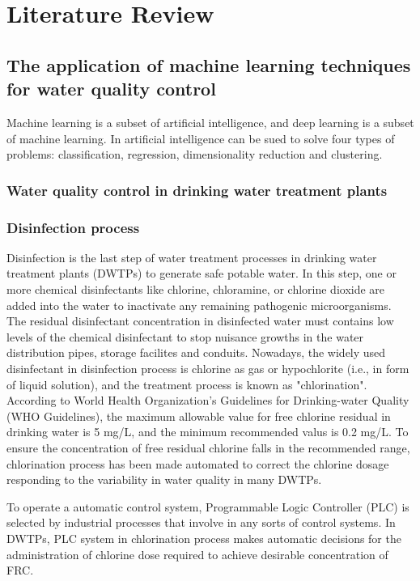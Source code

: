 \chapter{Literature Review}

\section{The application of machine learning techniques for water quality control}
Machine learning is a subset of artificial intelligence, and deep learning is a subset 
of machine learning. In artificial intelligence can be sued to solve four types of problems: 
classification, regression, dimensionality reduction and clustering. 
\subsection{Water quality control in drinking water treatment plants}
\subsection{Disinfection process}
Disinfection is the last step of water treatment processes in drinking water treatment plants (DWTPs) to generate safe potable water. In this step, one or more chemical disinfectants like chlorine, chloramine, or chlorine dioxide are added into the water to inactivate any remaining pathogenic microorganisms. The residual disinfectant concentration in disinfected water must contains low levels of the chemical disinfectant to stop nuisance growths in the water distribution pipes, storage facilites and conduits. Nowadays, the widely used disinfectant in disinfection process is chlorine as gas or hypochlorite (i.e., in form of liquid solution), and the treatment process is known as "chlorination". According to World Health Organization's Guidelines for Drinking-water Quality (WHO Guidelines), the maximum allowable value for free chlorine residual in drinking water is 5 mg/L, and the minimum recommended valus is 0.2 mg/L. To ensure the concentration of free residual chlorine falls in the recommended range, chlorination process has been made automated to correct the chlorine dosage responding to the variability in water quality in many DWTPs. 

To operate a automatic control system, Programmable Logic Controller (PLC) is selected by industrial processes that involve in any sorts of control systems. In DWTPs, PLC system in chlorination process makes automatic decisions for the administration of chlorine dose required to achieve desirable concentration of FRC. %

